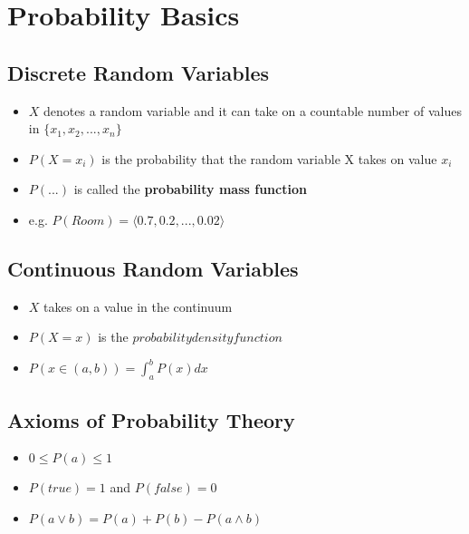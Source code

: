 \documentclass[../main.tex]{subfiles}
\begin{document}
\section{Probability Basics}

\subsection{Discrete Random Variables}
    \begin{itemize}
      \item $X$ denotes a random variable and it can take on a countable number of values in $\{x_{1}, x_{2}, ..., x_{n}\}$
      \item $P(X=x_{i})$ is the probability that the random variable X takes on value $x_{i}$
      \item $P(...)$ is called the \textbf{probability mass function}
      \item e.g. $P(Room) = \langle 0.7, 0.2, ..., 0.02 \rangle $
    \end{itemize}

\subsection{Continuous Random Variables}
    \begin{itemize}
      \item $X$ takes on a value in the continuum
      \item $P(X = x)$ is the $probability density function$
      \item $P(x \in (a,b)) = \int_{a}^{b}P(x)dx$
    \end{itemize}

\subsection{Axioms of Probability Theory}
    \begin{itemize}
      \item $0 \leq P(a) \leq 1$
      \item $P(true) = 1$ and $P(false) = 0$
      \item $P(a \vee b) = P(a) + P(b) - P(a \wedge b)$
    \end{itemize}
\end{document}
